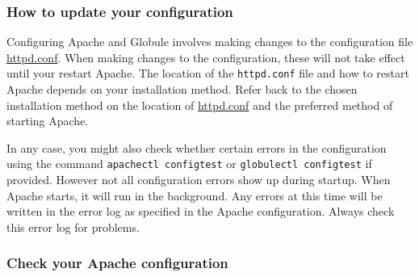 \documentclass[10pt,a4paper]{article}
\makeatletter
\newenvironment{p}{\@open{P}{}}{\@close{P}}
\newenvironment{p}{}{\par}
\makeatother
\begin{document}
\subsubsection{How to update your configuration}

\begin{p}
Configuring Apache and Globule involves making changes to the configuration
file \url{httpd.conf}.  When making changes to the configuration, these will
not take effect until your restart Apache.  The location of the
\verb!httpd.conf! file and how to restart Apache depends on your installation
method.  Refer back to the chosen installation method on the location of
\url{httpd.conf} and the preferred method of starting Apache.
\end{p}

\begin{p}
In any case, you might also check whether certain errors in the configuration
using the command \verb!apachectl configtest! or \verb!globulectl configtest!
if provided.  However not all configuration errors show up during startup.
When Apache starts, it will run in the background.  Any errors at this time
will be written in the error log as specified in the Apache configuration.
Always check this error log for problems.
\end{p}


\subsubsection{\label{sec:conf:normal}Check your Apache configuration}
\end{document}
